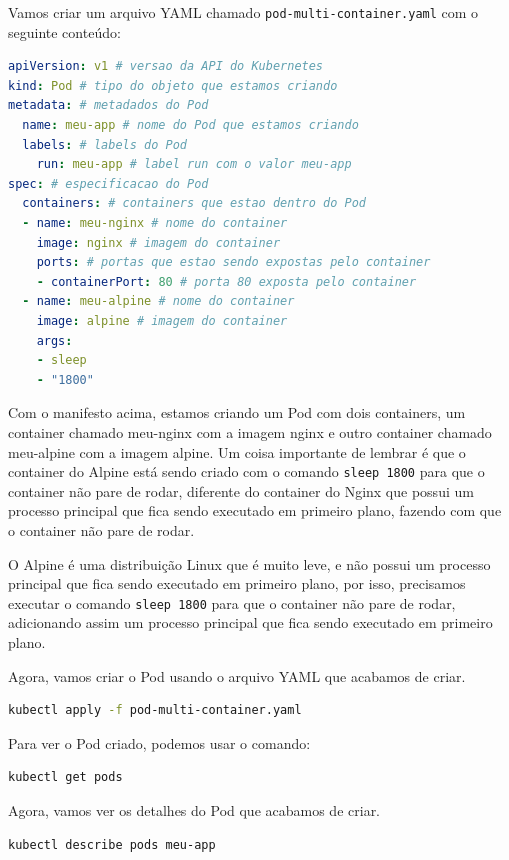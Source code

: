 \documentclass[12pt,a4paper]{article}
\begin{document}
Vamos criar um arquivo YAML chamado \texttt{pod-multi-container.yaml} com o seguinte conteúdo:

\begin{lstlisting}[language=yaml]
apiVersion: v1 # versao da API do Kubernetes
kind: Pod # tipo do objeto que estamos criando
metadata: # metadados do Pod 
  name: meu-app # nome do Pod que estamos criando
  labels: # labels do Pod
    run: meu-app # label run com o valor meu-app
spec: # especificacao do Pod
  containers: # containers que estao dentro do Pod
  - name: meu-nginx # nome do container
    image: nginx # imagem do container
    ports: # portas que estao sendo expostas pelo container
    - containerPort: 80 # porta 80 exposta pelo container
  - name: meu-alpine # nome do container
    image: alpine # imagem do container
    args:
    - sleep
    - "1800"
\end{lstlisting}

Com o manifesto acima, estamos criando um Pod com dois containers, um container chamado meu-nginx com a imagem nginx e outro container chamado meu-alpine com a imagem alpine. Um coisa importante de lembrar é que o container do Alpine está sendo criado com o comando \texttt{sleep 1800} para que o container não pare de rodar, diferente do container do Nginx que possui um processo principal que fica sendo executado em primeiro plano, fazendo com que o container não pare de rodar.

O Alpine é uma distribuição Linux que é muito leve, e não possui um processo principal que fica sendo executado em primeiro plano, por isso, precisamos executar o comando \texttt{sleep 1800} para que o container não pare de rodar, adicionando assim um processo principal que fica sendo executado em primeiro plano.

Agora, vamos criar o Pod usando o arquivo YAML que acabamos de criar.

\begin{lstlisting}[language=bash]
kubectl apply -f pod-multi-container.yaml
\end{lstlisting}

Para ver o Pod criado, podemos usar o comando:

\begin{lstlisting}[language=bash]
kubectl get pods
\end{lstlisting}

Agora, vamos ver os detalhes do Pod que acabamos de criar.

\begin{lstlisting}[language=bash]
kubectl describe pods meu-app
\end{lstlisting}
\end{document}
